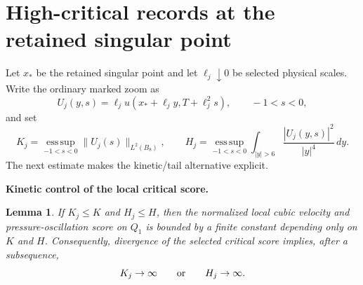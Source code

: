 \documentclass[11pt]{article}
\newtheorem{lemma}[theorem]{Lemma}
\theoremstyle{definition}\newtheorem{problem}[theorem]{Problem}
\theoremstyle{definition}
\theoremstyle{remark}
\begin{document}
\section{High-critical records at the retained singular point}
Let $x_*$ be the retained singular point and let $\ell_j\downarrow0$ be selected physical scales.  Write the ordinary marked zoom as
\[
U_j(y,s)=\ell_j u(x_*+\ell_j y,T+\ell_j^2s),\qquad -1<s<0,
\]
and set
\[
K_j=\operatorname*{ess\,sup}_{-1<s<0}\|U_j(s)\|_{L^2(B_8)},
\qquad
H_j=\operatorname*{ess\,sup}_{-1<s<0}\int_{|y|>6}\frac{|U_j(y,s)|^2}{|y|^4}\,dy.
\]
The next estimate makes the kinetic/tail alternative explicit.

\medskip
\noindent\textbf{Kinetic control of the local critical score.}
\begin{lemma}\label{lem:kinetic-critical}
If $K_j\le K$ and $H_j\le H$, then the normalized local cubic velocity and pressure-oscillation score on $Q_1$ is bounded by a finite constant depending only on $K$ and $H$.  Consequently, divergence of the selected critical score implies, after a subsequence,
\[
K_j\to\infty\qquad\hbox{or}\qquad H_j\to\infty.
\]
\end{lemma}
\end{document}
